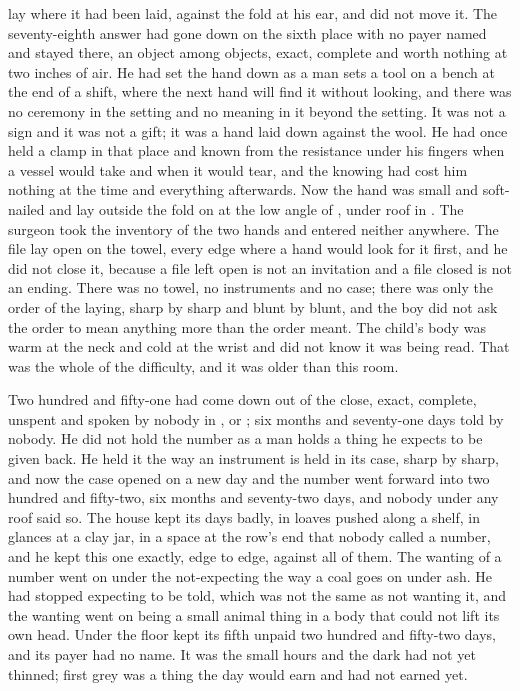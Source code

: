 
 lay where it had been laid, against the fold at his ear, and  did not move it. The seventy-eighth answer had gone down on the sixth place with no payer named and stayed there, an object among objects, exact, complete and worth nothing at two inches of air. He had set the hand down as a man sets a tool on a bench at the end of a shift, where the next hand will find it without looking, and there was no ceremony in the setting and no meaning in it beyond the setting. It was not a sign and it was not a gift; it was a hand laid down against the wool. He had once held a clamp in that place and known from the resistance under his fingers when a vessel would take and when it would tear, and the knowing had cost him nothing at the time and everything afterwards. Now the hand was small and soft-nailed and lay outside the fold on  at the low angle of , under  roof in . The surgeon took the inventory of the two hands and entered neither anywhere. The file lay open on the towel, every edge where a hand would look for it first, and he did not close it, because a file left open is not an invitation and a file closed is not an ending. There was no towel, no instruments and no case; there was only the order of the laying, sharp by sharp and blunt by blunt, and the boy did not ask the order to mean anything more than the order meant. The child's body was warm at the neck and cold at the wrist and did not know it was being read. That was the whole of the difficulty, and it was older than this room.

Two hundred and fifty-one had come down out of the close, exact, complete, unspent and spoken by nobody in ,  or ; six months and seventy-one days told by nobody. He did not hold the number as a man holds a thing he expects to be given back. He held it the way an instrument is held in its case, sharp by sharp, and now the case opened on a new day and the number went forward into two hundred and fifty-two, six months and seventy-two days, and nobody under any roof said so. The house kept its days badly, in loaves pushed along a shelf, in glances at a clay jar, in a space at the row's end that nobody called a number, and he kept this one exactly, edge to edge, against all of them. The wanting of a number went on under the not-expecting the way a coal goes on under ash. He had stopped expecting to be told, which was not the same as not wanting it, and the wanting went on being a small animal thing in a body that could not lift its own head. Under the floor  kept its fifth unpaid two hundred and fifty-two days, and its payer had no name. It was the small hours and the dark had not yet thinned; first grey was a thing the day would earn and had not earned yet.

